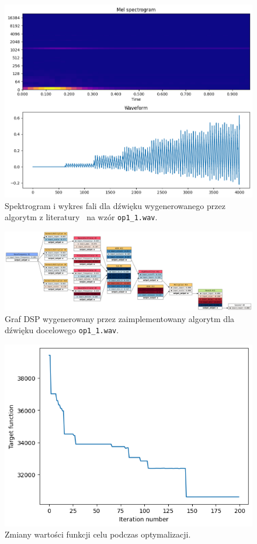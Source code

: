 \begin{figure}[H]
    \centering
    \includegraphics[width=0.7\linewidth]{rys06/macret_evolved_op1.png}
    \caption{
      Spektrogram i wykres fali dla dźwięku wygenerowanego
      przez algorytm z literatury~\cite{evolutionary_puredata} na wzór \texttt{op1\_1.wav}.
    }\label{fig:evolved_literature_op1_sound_overview}
\end{figure}

\begin{figure}
    \centering
    \includegraphics[angle=90,width=0.45\linewidth]{rys06/evolved_graph_op1.png}
    \caption{
      Graf DSP wygenerowany przez zaimplementowany algorytm
      dla dźwięku docelowego \texttt{op1\_1.wav}.
    }\label{fig:evolved_graph_op1}
\end{figure}


\begin{figure}[H]
    \centering
    \includegraphics[width=0.6\linewidth]{rys06/op1_target_fun_values.png}
    \caption{
      Zmiany wartości funkcji celu podczas optymalizacji.
    }%
\end{figure}

